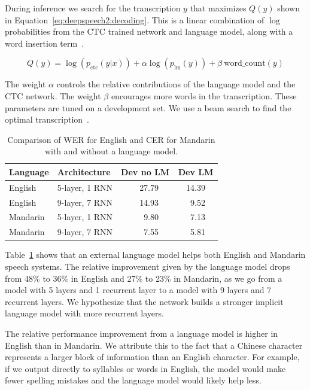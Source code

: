 During inference we search for the transcription $y$ that maximizes $Q(y)$
shown in Equation~\ref{eq:deepspeech2:decoding}. This is a linear combination
of $\log$ probabilities from the CTC trained network and language model, along
with a word insertion term~\cite{hannun2014deepspeech}. 

\begin{equation}
\label{eq:deepspeech2:decoding}
Q(y) = \log (p_{\textrm{ctc}}(y|x)) + \alpha \log(p_{\textrm{lm}}(y))  + \beta \: \textrm{word\_count}(y)
\end{equation}

The weight $\alpha$ controls the relative contributions of the language model
and the CTC network. The weight $\beta$ encourages more words in the
transcription. These parameters are tuned on a development set. We use a beam
search to find the optimal transcription~\cite{hannun2014firstpass}.

\begin{table}
\centering
\begin{tabular}{l  l  r r r r r r}
\toprule
Language & Architecture & \multicolumn{3}{c}{Dev no LM} & \multicolumn{3}{c}{Dev LM} \\
\midrule
English  & 5-layer, 1 RNN & & 27.79 & & & 14.39 & \\
English  & 9-layer, 7 RNN & & 14.93 & & & 9.52 & \\
Mandarin & 5-layer, 1 RNN & & 9.80  & & & 7.13 & \\
Mandarin & 9-layer, 7 RNN & & 7.55  & & & 5.81 & \\
\bottomrule
\end{tabular}
\caption{Comparison of WER for English and CER for Mandarin with and without a
         language model.}
\label{table:deepspeech2:languagemodels}
\end{table}

Table~\ref{table:deepspeech2:languagemodels} shows that an external language
model helps both English and Mandarin speech systems. The relative improvement
given by the language model drops from 48\% to 36\% in English and 27\% to 23\%
in Mandarin, as we go from a model with 5 layers and 1 recurrent layer to a
model with 9 layers and 7 recurrent layers. We hypothesize that the network
builds a stronger implicit language model with more recurrent layers. 

The relative performance improvement from a language model is higher in English
than in Mandarin. We attribute this to the fact that a Chinese character
represents a larger block of information than an English character. For
example, if we output directly to syllables or words in English, the model
would make fewer spelling mistakes and the language model would likely help
less.

